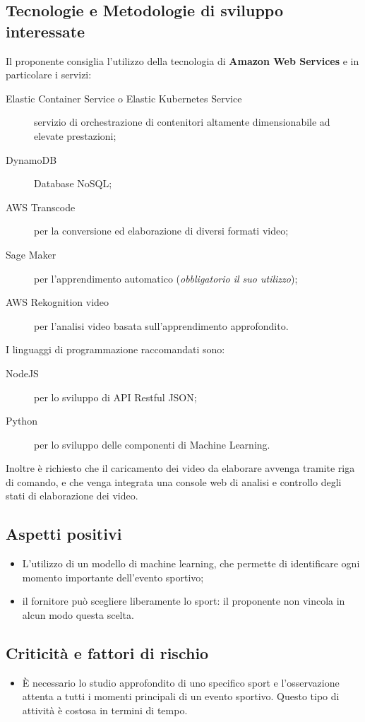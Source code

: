 \documentclass[../studio-di-fattibilita.tex]{subfiles}
\begin{document}
	\subsection{Tecnologie e Metodologie di sviluppo interessate}
	\label{subsec:tecnologie_interessate}
	Il proponente consiglia l'utilizzo della tecnologia di \textbf{Amazon Web Services} e in particolare i servizi:
	\begin{description}
		\item[Elastic Container Service o Elastic Kubernetes Service] servizio di orchestrazione di contenitori altamente dimensionabile ad elevate prestazioni;
		\item[DynamoDB] Database NoSQL;
		\item[AWS Transcode] per la conversione ed elaborazione di diversi formati video;
		\item[Sage Maker] per l'apprendimento automatico (\textit{obbligatorio il suo utilizzo});
		\item[AWS Rekognition video] per l'analisi video basata sull'apprendimento approfondito.
	\end{description}
	I linguaggi di programmazione raccomandati sono:
	\begin{description}
		\item[NodeJS] per lo sviluppo di API Restful JSON;
		\item[Python] per lo sviluppo delle componenti di Machine Learning.
	\end{description}
	Inoltre è richiesto che il caricamento dei video da elaborare avvenga tramite riga di comando, e che venga integrata una console web di analisi e controllo degli stati di elaborazione dei video.

	
	\subsection{Aspetti positivi}
	\label{subsec:aspetti_positivi}
	\begin{itemize}
		\item L'utilizzo di un modello di machine learning, che permette di identificare ogni momento importante dell’evento sportivo;
		\item il fornitore può scegliere liberamente lo sport: il proponente non vincola in alcun modo questa scelta.
	\end{itemize}


	\subsection{Criticità e fattori di rischio}
	\label{sec:criticita_e_fattori_di_rischio}
	\begin{itemize}
		\item È necessario lo studio approfondito di uno specifico sport e l'osservazione attenta a tutti i momenti principali di un evento sportivo. Questo tipo di attività è costosa in termini di tempo.
	\end{itemize}
\end{document}
